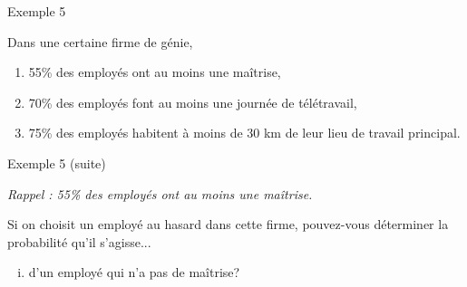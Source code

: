 \documentclass{BeamerTemplate}
\begin{document}

\begin{frame}[t]{Exemple 5}

\small
 Dans une certaine firme de génie,
 \begin{enumerate}[$\bullet$]
 \item 55\% des employés ont au moins une maîtrise,
 \item 70\% des employés font au moins une journée de télétravail,
 \item 75\% des employés habitent à moins de 30 km de leur lieu de travail principal.
 \end{enumerate}
 

\end{frame}

 \begin{frame}[t]{Exemple 5 (suite)}
 \small{
 \textit{Rappel : 55\% des employés ont au moins une maîtrise.}

 \medskip

 Si on choisit un employé au hasard dans cette firme, pouvez-vous déterminer la probabilité qu'il s'agisse...
  \begin{enumerate}[(i)]\itemsep.8cm
 \item d'un employé qui n'a pas de maîtrise? %

 \end{enumerate}
}
\end{frame}
\end{document}

